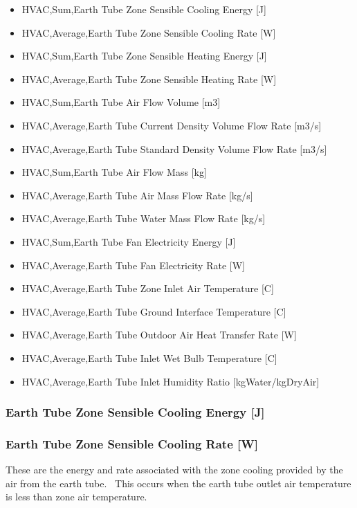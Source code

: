 \begin{itemize}
\item
  HVAC,Sum,Earth Tube Zone Sensible Cooling Energy {[}J{]}
\item
  HVAC,Average,Earth Tube Zone Sensible Cooling Rate {[}W{]}
\item
  HVAC,Sum,Earth Tube Zone Sensible Heating Energy {[}J{]}
\item
  HVAC,Average,Earth Tube Zone Sensible Heating Rate {[}W{]}
\item
  HVAC,Sum,Earth Tube Air Flow Volume {[}m3{]}
\item
  HVAC,Average,Earth Tube Current Density Volume Flow Rate {[}m3/s{]}
\item
  HVAC,Average,Earth Tube Standard Density Volume Flow Rate {[}m3/s{]}
\item
  HVAC,Sum,Earth Tube Air Flow Mass {[}kg{]}
\item
  HVAC,Average,Earth Tube Air Mass Flow Rate {[}kg/s{]}
\item
  HVAC,Average,Earth Tube Water Mass Flow Rate {[}kg/s{]}
\item
  HVAC,Sum,Earth Tube Fan Electricity Energy {[}J{]}
\item
  HVAC,Average,Earth Tube Fan Electricity Rate {[}W{]}
\item
  HVAC,Average,Earth Tube Zone Inlet Air Temperature {[}C{]}
\item
  HVAC,Average,Earth Tube Ground Interface Temperature {[}C{]}
\item
  HVAC,Average,Earth Tube Outdoor Air Heat Transfer Rate {[}W{]}
\item
  HVAC,Average,Earth Tube Inlet Wet Bulb Temperature {[}C{]}
\item
  HVAC,Average,Earth Tube Inlet Humidity Ratio {[}kgWater/kgDryAir{]}
\end{itemize}

\subsubsection{Earth Tube Zone Sensible Cooling Energy {[}J{]}}\label{earth-tube-zone-sensible-cooling-energy-j}

\subsubsection{Earth Tube Zone Sensible Cooling Rate {[}W{]}}\label{earth-tube-zone-sensible-cooling-rate-w}

These are the energy and rate associated with the zone cooling provided by the air from the earth tube.~ This occurs when the earth tube outlet air temperature is less than zone air temperature.

